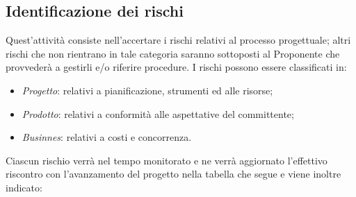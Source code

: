 \documentclass[12pt,a4paper,titlepage]{article}
\begin{document}
	\subsection{Identificazione dei rischi}
		Quest'attività consiste nell'accertare i rischi relativi al processo progettuale; altri rischi che non rientrano in tale categoria saranno sottoposti al Proponente che provvederà a gestirli e/o riferire procedure.
		I rischi possono essere classificati in:
		\begin{itemize}
			\item \textit{Progetto}: relativi a pianificazione, strumenti ed alle risorse;
			\item \textit{Prodotto}: relativi a conformità alle aspettative del committente;
			\item \textit{Businnes}: relativi a costi e concorrenza.
		\end{itemize}
		Ciascun rischio verrà nel tempo monitorato e ne verrà aggiornato l'effettivo riscontro con l'avanzamento del progetto nella tabella che segue e viene inoltre indicato:
\end{document}
